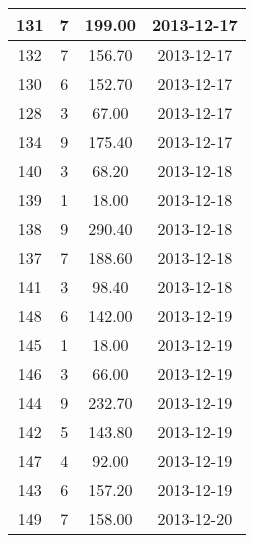 \documentclass[a4paper,10pt]{report}
\begin{document}
\begin{longtable}{|c|c|c|c|}
131&   7& 199.00& 2013-12-17\\ \hline
132&   7& 156.70& 2013-12-17\\ \hline
130&   6& 152.70& 2013-12-17\\ \hline
128&   3&  67.00& 2013-12-17\\ \hline
134&   9& 175.40& 2013-12-17\\ \hline
140&   3&  68.20& 2013-12-18\\ \hline
139&   1&  18.00& 2013-12-18\\ \hline
138&   9& 290.40& 2013-12-18\\ \hline
137&   7& 188.60& 2013-12-18\\ \hline
141&   3&  98.40& 2013-12-18\\ \hline
148&   6& 142.00& 2013-12-19\\ \hline
145&   1&  18.00& 2013-12-19\\ \hline
146&   3&  66.00& 2013-12-19\\ \hline
144&   9& 232.70& 2013-12-19\\ \hline
142&   5& 143.80& 2013-12-19\\ \hline
147&   4&  92.00& 2013-12-19\\ \hline
143&   6& 157.20& 2013-12-19\\ \hline
149&   7& 158.00& 2013-12-20\\ \hline
\end{longtable}
\end{document}
